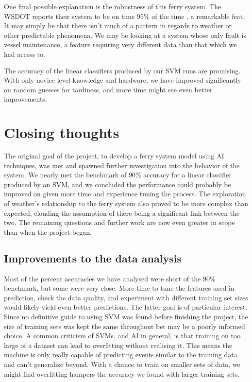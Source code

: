 \documentclass[11pt]{article} %
\begin{document}
One final possible explanation is the robustness of this ferry system. The 
WSDOT reports their system to be on time 95\% of the time \cite{wsdotComparison},
a remarkable feat. It may simply be that there isn't much of a pattern in regards
to weather or other predictable phenomena. We may be looking at a system whose
only fault is vessel maintenance, a feature requiring very different data than
that which we had access to. 

The accuracy of the linear classifiers produced by our SVM runs are promising.
With only novice level knowledge and hardware, we have improved significantly on
random guesses for tardiness, and more time might see even better improvements.

\section{Closing thoughts}
\label{sec:summary}
The original goal of the project, to develop a ferry system model using AI 
techniques, was met and spawned further investigation into the behavior of the
system. We nearly met the benchmark of $90\%$ accuracy for a linear classifier 
produced by an SVM, and we concluded the performance could probably be improved
on given more time and experience tuning the process. The exploration of weather's
relationship to the ferry system also proved to be more complex than expected, 
clouding the assumption of there being a significant link between the two. The 
remaining questions and further work are now even greater in scope than when
the project began.


\subsection{Improvements to the data analysis}
\label{sec:improvements}
Most of the percent accuracies we have analysed were short of the $90\%$ benchmark,
but some were very close. More time to tune the features used in prediction, 
check the data quality, and experiment with different training set sizes would
likely yield even better predictions. The latter goal is of particular interest.
Since no definitive guide to using SVM was found before finishing the project, 
the size of training sets was kept the same throughout bet may be a poorly informed
choice. A common criticism of SVMs, and AI in general, is that training on too
large of a dataset can lead to overfitting without realising it. This means the
machine is only really capable of predicting events similar to the training data
and can't generalize beyond. With a chance to train on smaller sets of data,
we might find overfitting hampers the accuracy we found with larger training sets.
\end{document}
